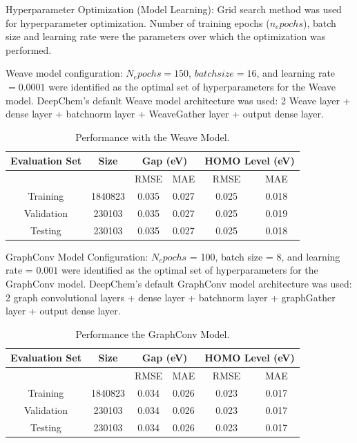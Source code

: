 \documentclass[book.tex]{subfiles}
\begin{document}
Hyperparameter Optimization (Model Learning): Grid search method was used for hyperparameter optimization. Number of training epochs ($n_epochs$), batch size and learning rate were the parameters over which the optimization was performed.

Weave model configuration: $N_epochs = 150$, $batch size = 16$, and learning rate $= 0.0001$ were identified as the optimal set of hyperparameters for the Weave model. DeepChem’s default Weave model architecture was used: 2 Weave layer + dense layer + batchnorm layer + WeaveGather layer + output dense layer.


\begin{table}[!htbp]
\centering
\caption{Performance with the Weave Model.}
\begin{tabular}{*6c}
\toprule
Evaluation Set  & Size &  \multicolumn{2}{c}{Gap (eV)} & \multicolumn{2}{c}{HOMO Level (eV)}\\
\midrule
     &    & RMSE    & MAE   & RMSE & MAE\\
\midrule
Training&1840823    &  0.035 & 0.027    & 0.025
   &  0.018\\
Validation& 230103   &  0.035 & 0.027   & 0.025  & 0.019\\
Testing& 230103   &  0.035 & 0.027   &  0.025  & 0.018\\
\bottomrule
\end{tabular}
\end{table}


GraphConv Model Configuration: $N_epochs$ = 100, batch size = 8, and learning rate = $0.001$ were identified as the optimal set of hyperparameters for the GraphConv model. DeepChem’s default GraphConv model architecture was used:  2 graph convolutional layers + dense layer + batchnorm layer + graphGather layer + output dense layer.

\begin{table}[!htbp]
\centering
\caption{Performance the GraphConv Model.}
\begin{tabular}{*6c}
\toprule
Evaluation Set  & Size &  \multicolumn{2}{c}{Gap (eV)} & \multicolumn{2}{c}{HOMO Level (eV)}\\
\midrule
     &    & RMSE    & MAE   & RMSE & MAE\\
\midrule
Training&1840823    &  0.034 & 0.026    & 0.023
   &  0.017\\
Validation& 230103   &  0.034 & 0.026   & 0.023  & 0.017\\
Testing& 230103   &  0.034 & 0.026   &  0.023  & 0.017\\
\bottomrule
\end{tabular}
\end{table}
\end{document}
